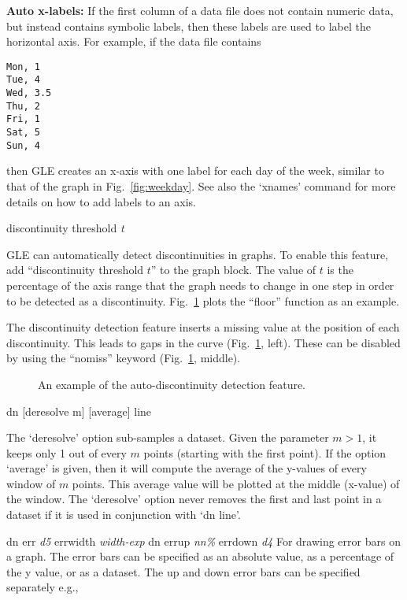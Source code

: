 \begin{commanddescription}
{\bf Auto x-labels:} If the first column of a data file does not contain numeric data, but instead contains symbolic labels, then these labels are used to label the horizontal axis. For example, if the data file contains

\begin{Verbatim}
Mon, 1
Tue, 4
Wed, 3.5
Thu, 2
Fri, 1
Sat, 5
Sun, 4
\end{Verbatim}

\noindent{}then GLE creates an x-axis with one label for each day of the week, similar to that of the graph in Fig.~\ref{fig:weekday}. See also the `{\sf xnames}' command for more details on how to add labels to an axis.

\item[{\sf discontinuity threshold {\it t}}]

GLE can automatically detect discontinuities in graphs. To enable this feature, add ``{\sf discontinuity threshold $t$}'' to the graph block. The value of $t$ is the percentage of the axis range that the graph needs to change in one step in order to be detected as a discontinuity. Fig.~\ref{fig:discont} plots the ``floor'' function as an example.

The discontinuity detection feature inserts a missing value at the position of each discontinuity. This leads to gaps in the curve (Fig.~\ref{fig:discont}, left). These can be disabled by using the ``nomiss'' keyword (Fig.~\ref{fig:discont}, middle).

\begin{figure}
\centering
\mbox{}
\caption{\label{fig:discont}An example of the auto-discontinuity detection feature.}
\end{figure}

\item[{\sf dn [deresolve m] [average] line}]

The `{\sf deresolve}' option sub-samples a dataset. Given the parameter $m > 1$, it keeps only 1 out of every $m$ points (starting with the first point). If the option `{\sf average}' is given, then it will compute the average of the y-values of every window of $m$ points. This average value will be plotted at the middle (x-value) of the window. The `{\sf deresolve}' option never removes the first and last point in a dataset if it is used in conjunction with `{\sf dn line}'.

\item[{\sf dn err {\it d5} errwidth {\it width-exp} dn errup {\it nn\%} errdown {\it d4}} ]
   
For drawing error bars on a graph. The error bars can be specified as
an absolute value, as a percentage of the y value, or as a dataset.
The up and down error bars can be specified separately e.g.,


\end{commanddescription}
